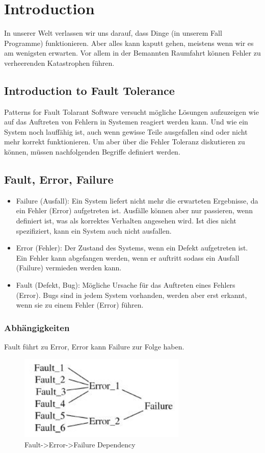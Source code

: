 \section{Introduction}
In unserer Welt verlassen wir uns darauf, dass Dinge (in unserem Fall Programme) funktionieren. Aber alles kann kaputt gehen, meistens wenn wir es am wenigsten erwarten. Vor allem in der Bemannten Raumfahrt können Fehler zu verheerenden Katastrophen führen.

\subsection*{Introduction to Fault Tolerance}
Patterns for Fault Tolarant Software versucht mögliche Lösungen aufzuzeigen wie auf das Auftreten von Fehlern in Systemen reagiert werden kann. Und wie ein System noch lauffähig ist, auch wenn gewisse Teile ausgefallen sind oder nicht mehr korrekt funktionieren. Um aber über die Fehler Toleranz diskutieren zu können, müssen nachfolgenden Begriffe definiert werden.

\subsection{Fault, Error, Failure}
\begin{itemize}
	\item Failure (Ausfall): Ein System liefert nicht mehr die erwarteten Ergebnisse, da ein Fehler (Error) aufgetreten ist. Ausfälle können aber nur passieren, wenn definiert ist, was als korrektes Verhalten angesehen wird. Ist dies nicht spezifiziert, kann ein System auch nicht ausfallen.
	\item Error (Fehler): Der Zustand des Systems, wenn ein Defekt aufgetreten ist. Ein Fehler kann abgefangen werden, wenn er auftritt sodass ein Ausfall (Failure) vermieden werden kann.
	\item Fault (Defekt, Bug): Mögliche Ursache für das Auftreten eines Fehlers (Error). Bugs sind in jedem System vorhanden, werden aber erst erkannt, wenn sie zu einem Fehler (Error) führen.
\end{itemize}

\subsubsection*{Abhängigkeiten}
 Fault führt zu Error, Error kann Failure zur Folge haben.

\begin{figure}[H]
	\centering
	\includegraphics[width=8cm]{content/faulttolerance/images/fault-error-failure-dependency.jpg}
	\caption{Fault->Error->Failure Dependency}
\end{figure}

